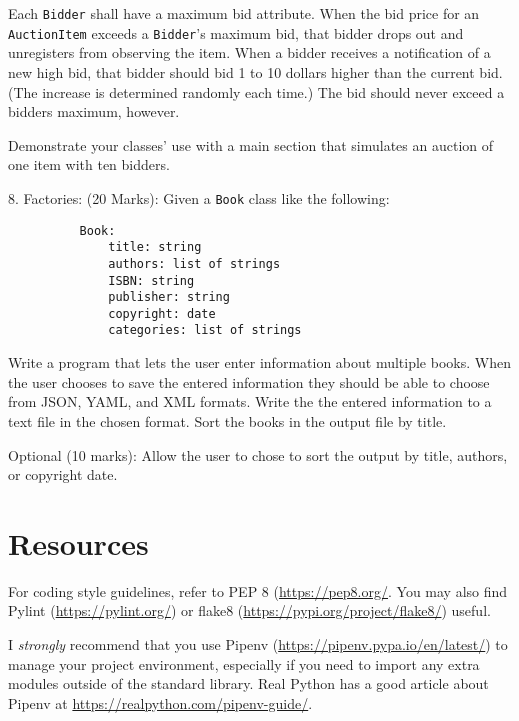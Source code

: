 \documentclass{article}
\begin{document}
Each \texttt{Bidder} shall have a maximum bid attribute. When the bid price for an \texttt{AuctionItem} exceeds a \texttt{Bidder}'s maximum bid, that bidder drops out and unregisters from observing the item. When a bidder receives a notification of a new high bid, that bidder should bid  1 to 10 dollars higher than the current bid. (The increase is determined randomly each time.) The bid should never exceed a bidders maximum, however.

Demonstrate your classes' use with a main section that simulates an auction of one item with ten bidders.

\vspace{3mm}     
8. Factories: (20 Marks): Given a \texttt{Book} class like the following:
\begin{verbatim}
          Book:
              title: string
              authors: list of strings
              ISBN: string
              publisher: string
              copyright: date
              categories: list of strings
\end{verbatim}

Write a program that lets the user enter information about multiple books. When the user chooses to save the entered information they should be able to choose from JSON, YAML, and XML formats. Write the the entered information to a text file in the chosen format. Sort the books in the output file by title.

Optional (10 marks): Allow the user to chose to sort the output by title, authors, or copyright date.

\section*{Resources}
For coding style guidelines, refer to PEP 8 (\url{https://pep8.org/}. You may also find Pylint (\url{https://pylint.org/}) or flake8 (\url{https://pypi.org/project/flake8/}) useful.

I \emph{strongly} recommend that you use Pipenv (\url{https://pipenv.pypa.io/en/latest/}) to manage your project environment, especially if you need to import any extra modules outside of the standard library. Real Python has a good article about Pipenv at \url{https://realpython.com/pipenv-guide/}.

         
           
\end{document}
